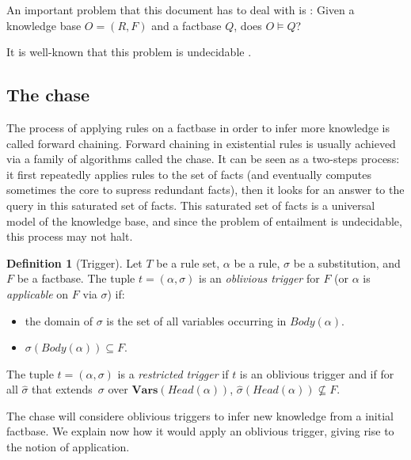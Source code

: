 \documentclass{article}
\theoremstyle{definition}
\newtheorem{definition}{Definition}[section]
\theoremstyle{remark}
\newcommand{\Vars}{\textbf{Vars}}
\begin{document}
An important problem that this document has to deal with is : Given a knowledge base $O=(R,F)$ and a factbase $Q$,  does $O \models Q$?

It  is  well-known  that  this  problem  is  undecidable \cite{NP}.



\subsection{The chase}

The process of applying rules on a factbase in order to infer more knowledge is called forward chaining.   Forward  chaining  in  existential  rules  is  usually achieved  via  a  family  of  algorithms  called the  chase. It can be seen as a two-steps process: it first repeatedly applies rules to the set of facts (and eventually computes sometimes the core to supress redundant facts), then it looks for an answer to the query in this saturated set of facts. This saturated set of facts is a universal model of the knowledge base, and since the problem of entailment is undecidable, this process may not halt.

\begin{definition}[Trigger]
Let $T$ be a rule set, $\alpha$ be a rule, $\sigma$ be a substitution, and $F$ be a factbase. The tuple $t = (\alpha,\sigma)$ is an \emph{oblivious trigger} for $F$ (or $\alpha$ is \emph{applicable} on $F$ via $\sigma$) if: 
\begin{itemize}
\item the domain of $\sigma$ is the set of all variables occurring in $Body(\alpha)$.
\item $\sigma(Body(\alpha)) \subseteq F$.
\end{itemize}
The tuple $t = (\alpha,\sigma)$ is a \emph{restricted trigger} if $t$ is an oblivious trigger and if for all $\hat \sigma$ that extends\ $\sigma$ over $\Vars(\textit{Head}(\alpha))$, $\hat \sigma(Head(\alpha)) \nsubseteq F$.

\end{definition} 

The chase will considere oblivious triggers to infer new knowledge from a initial factbase. We explain now how it would apply an oblivious trigger, giving rise to the notion of application. 
\end{document}
